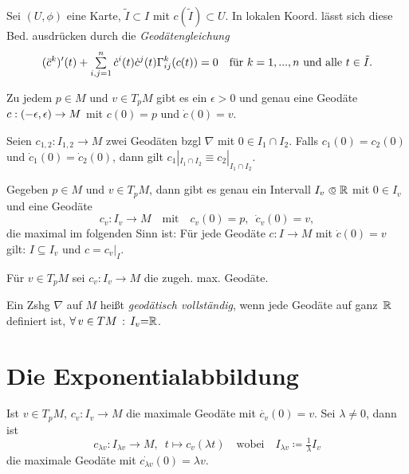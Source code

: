 \documentclass{cheat-sheet}
\newcommand{\vinterval}{\ointerval{-\epsilon}{\epsilon}} %
\begin{document}
\begin{bem}
  Sei $(U, \phi)$ eine Karte, $\tilde{I} \subset I$ mit $c(\tilde{I}) \subset U$.
  In lokalen Koord. lässt sich diese Bed. ausdrücken durch die \emph{Geodätengleichung}
  \[
    (\ddot{c}^{k})'(t) + \sum_{i,j=1}^n \dot{c}^i(t) \dot{c}^j(t) \Gamma_{ij}^k(c(t)) = 0
    \quad \text{für $k = 1, \nldots, n$ und alle $t \in \tilde{I}$.}
  \]
\end{bem}

\begin{satz}
  Zu jedem $p \in M$ und $v \in T_p M$ gibt es ein $\epsilon > 0$ und genau eine Geodäte $c : \vinterval \to M$ mit $c(0) = p$ und $\dot{c}(0) = v$.
\end{satz}

\begin{lem}
  Seien $c_{1,2} : I_{1,2} \to M$ zwei Geodäten bzgl $\nabla$ mit $0 \in I_1 \cap I_2$. Falls $c_1(0) = c_2(0)$ und $\dot{c}_1(0) = \dot{c}_2(0)$, dann gilt $c_1|_{I_1 \cap I_2} \equiv c_2|_{I_1 \cap I_2}$.
\end{lem}

\begin{lemdefn}
  Gegeben $p \in M$ und $v \in T_p M$, dann gibt es genau ein Intervall $I_v \opn \R$ mit $0 \in I_v$ und eine Geodäte
  \[
    c_v : I_v \to M
    \quad \text{mit} \quad
    c_v(0) = p, \enspace \dot{c}_v(0) = v,
  \]
  die maximal im folgenden Sinn ist: Für jede Geodäte $c : I \to M$ mit $\dot{c}(0) = v$ gilt: $I \subseteq I_v$ und $c = c_v|_I$.
\end{lemdefn}

\begin{nota}
  Für $v \in T_p M$ sei $c_v : I_v \to M$ die zugeh. max. Geodäte.
\end{nota}

\begin{defn}
  Ein Zshg $\nabla$ auf $M$ heißt \emph{geodätisch vollständig}, wenn jede Geodäte auf ganz~$\mathbb{R}$ definiert ist, \dh{} $\forall \, {v \in TM} \,:\, I_v {=} \mathbb{R}$.
\end{defn}

\section{Die Exponentialabbildung}

\begin{lem}
  Ist $v \in T_p M$, $c_v : I_v \to M$ die maximale Geodäte mit $\dot{c_v}(0) = v$.
  Sei $\lambda \not= 0$, dann ist
  \[
    c_{\lambda v} : I_{\lambda v} \to M, \enspace
    t \mapsto c_v(\lambda t) \quad \text{wobei} \quad
    I_{\lambda v} \coloneqq \tfrac{1}{\lambda} I_v
  \]
  die maximale Geodäte mit $\dot{c_{\lambda v}}(0) = \lambda v$.
\end{lem}
\end{document}

